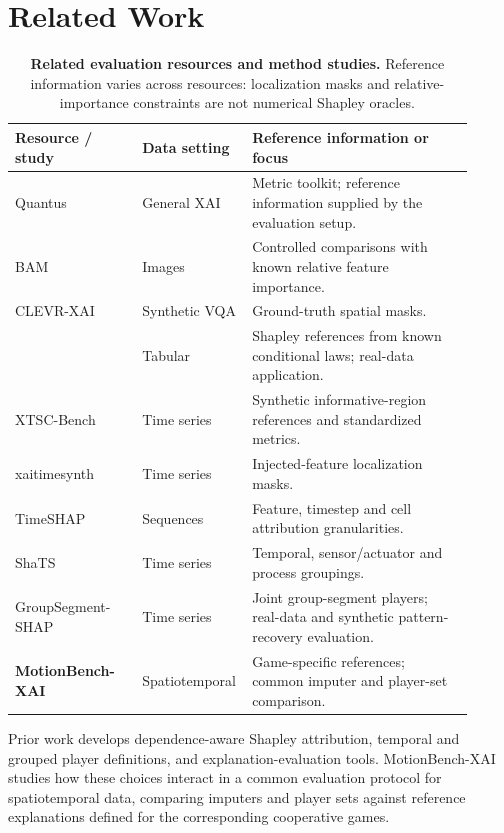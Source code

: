 
\section{Related Work}
\label{sec:related}

\begin{table}[t]
\centering
\caption{\textbf{Related evaluation resources and method studies.}
Reference information varies across resources: localization masks and
relative-importance constraints are not numerical Shapley oracles.}
\label{tab:related_benchmarks}
\setlength{\tabcolsep}{3pt}
\scriptsize
\begin{tabular}{p{0.27\linewidth}p{0.17\linewidth}p{0.47\linewidth}}
\toprule
Resource / study & Data setting & Reference information or focus \\
\midrule
Quantus~\citep{hedstrom2023quantus}
 & General XAI & Metric toolkit; reference information supplied by the evaluation setup. \\
BAM~\citep{Yang2019BenchmarkingAM}
 & Images & Controlled comparisons with known relative feature importance. \\
CLEVR-XAI~\citep{arras2022clevr}
 & Synthetic VQA & Ground-truth spatial masks. \\
\citet{olsen2022using}
 & Tabular & Shapley references from known conditional laws; real-data application. \\
XTSC-Bench~\citep{hollig2023xtsc}
 & Time series & Synthetic informative-region references and standardized metrics. \\
xaitimesynth~\citep{baer2026xaitimesynth}
 & Time series & Injected-feature localization masks. \\
TimeSHAP~\citep{bento2021timeshap}
 & Sequences & Feature, timestep and cell attribution granularities. \\
ShaTS~\citep{de2025shats}
 & Time series & Temporal, sensor/actuator and process groupings. \\
GroupSegment-SHAP~\citep{kim2026groupsegment}
 & Time series & Joint group-segment players; real-data and synthetic pattern-recovery evaluation. \\
\textbf{MotionBench-XAI}
 & Spatiotemporal & Game-specific references; common imputer and player-set comparison. \\
\bottomrule
\end{tabular}
\end{table}

Prior work develops dependence-aware Shapley attribution, temporal and grouped player definitions, and explanation-evaluation tools. MotionBench-XAI studies how these choices interact in a common evaluation protocol for spatiotemporal data, comparing imputers and player sets against reference explanations defined for the corresponding cooperative games.

